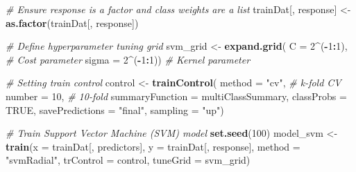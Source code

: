 \documentclass[
]{article}
\newenvironment{Shaded}{\begin{snugshade}}{\end{snugshade}}
\newcommand{\AttributeTok}[1]{\textcolor[rgb]{0.13,0.29,0.53}{#1}}
\newcommand{\CommentTok}[1]{\textcolor[rgb]{0.56,0.35,0.01}{\textit{#1}}}
\newcommand{\ConstantTok}[1]{\textcolor[rgb]{0.56,0.35,0.01}{#1}}
\newcommand{\DecValTok}[1]{\textcolor[rgb]{0.00,0.00,0.81}{#1}}
\newcommand{\FunctionTok}[1]{\textcolor[rgb]{0.13,0.29,0.53}{\textbf{#1}}}
\newcommand{\NormalTok}[1]{#1}
\newcommand{\OtherTok}[1]{\textcolor[rgb]{0.56,0.35,0.01}{#1}}
\newcommand{\SpecialCharTok}[1]{\textcolor[rgb]{0.81,0.36,0.00}{\textbf{#1}}}
\newcommand{\StringTok}[1]{\textcolor[rgb]{0.31,0.60,0.02}{#1}}
\begin{document}
\begin{Shaded}
\begin{Highlighting}[]
\CommentTok{\# Ensure response is a factor and class weights are a list}
\NormalTok{trainDat[, response] }\OtherTok{\textless{}{-}} \FunctionTok{as.factor}\NormalTok{(trainDat[, response])}

\CommentTok{\# Define hyperparameter tuning grid }
\NormalTok{svm\_grid }\OtherTok{\textless{}{-}} \FunctionTok{expand.grid}\NormalTok{(}
  \AttributeTok{C =} \DecValTok{2}\SpecialCharTok{\^{}}\NormalTok{(}\SpecialCharTok{{-}}\DecValTok{1}\SpecialCharTok{:}\DecValTok{1}\NormalTok{),         }\CommentTok{\# Cost parameter}
  \AttributeTok{sigma =} \DecValTok{2}\SpecialCharTok{\^{}}\NormalTok{(}\SpecialCharTok{{-}}\DecValTok{1}\SpecialCharTok{:}\DecValTok{1}\NormalTok{))     }\CommentTok{\# Kernel parameter}

\CommentTok{\# Setting train control}
\NormalTok{control }\OtherTok{\textless{}{-}} \FunctionTok{trainControl}\NormalTok{(}
  \AttributeTok{method =} \StringTok{"cv"}\NormalTok{,         }\CommentTok{\# k{-}fold CV}
  \AttributeTok{number =} \DecValTok{10}\NormalTok{,           }\CommentTok{\# 10{-}fold}
  \AttributeTok{summaryFunction =}\NormalTok{ multiClassSummary,}
  \AttributeTok{classProbs =} \ConstantTok{TRUE}\NormalTok{,}
  \AttributeTok{savePredictions =} \StringTok{"final"}\NormalTok{,}
  \AttributeTok{sampling =} \StringTok{"up"}\NormalTok{)}

\CommentTok{\# Train Support Vector Machine (SVM) model}
\FunctionTok{set.seed}\NormalTok{(}\DecValTok{100}\NormalTok{)}
\NormalTok{model\_svm }\OtherTok{\textless{}{-}} \FunctionTok{train}\NormalTok{(}\AttributeTok{x =}\NormalTok{ trainDat[, predictors],}
                   \AttributeTok{y =}\NormalTok{ trainDat[, response],}
                   \AttributeTok{method =} \StringTok{"svmRadial"}\NormalTok{,}
                   \AttributeTok{trControl =}\NormalTok{ control,}
                   \AttributeTok{tuneGrid =}\NormalTok{ svm\_grid)}
\end{Highlighting}
\end{Shaded}

\begin{Shaded}
\end{Shaded}
\end{document}

